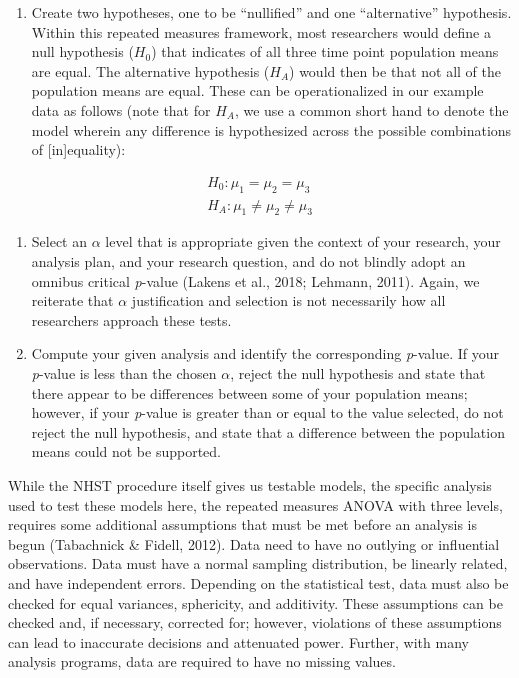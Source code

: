 \documentclass[english,mask,man]{apa6}
\providecommand{\tightlist}{%
  \setlength{\itemsep}{0pt}\setlength{\parskip}{0pt}}
\theoremstyle{definition}
\theoremstyle{definition}
\theoremstyle{definition}
\theoremstyle{remark}
\begin{document}
\begin{enumerate}
\def\labelenumi{\arabic{enumi})}
\tightlist
\item
  Create two hypotheses, one to be \enquote{nullified} and one
  \enquote{alternative} hypothesis. Within this repeated measures
  framework, most researchers would define a null hypothesis (\(H_0\))
  that indicates of all three time point population means are equal. The
  alternative hypothesis (\(H_A\)) would then be that not all of the
  population means are equal. These can be operationalized in our
  example data as follows (note that for \(H_A\), we use a common short
  hand to denote the model wherein any difference is hypothesized across
  the possible combinations of {[}in{]}equality):
\end{enumerate}

\[
\begin{aligned}
  H_0: \mu_1 = \mu_2 = \mu_3 \\
  H_A: \mu_1 \neq \mu_2 \neq \mu_3
\end{aligned}
\]

\begin{enumerate}
\def\labelenumi{\arabic{enumi})}
\setcounter{enumi}{1}
\item
  Select an \(\alpha\) level that is appropriate given the context of
  your research, your analysis plan, and your research question, and do
  not blindly adopt an omnibus critical \emph{p}-value (Lakens et al.,
  2018; Lehmann, 2011). Again, we reiterate that \(\alpha\)
  justification and selection is not necessarily how all researchers
  approach these tests.
\item
  Compute your given analysis and identify the corresponding
  \emph{p}-value. If your \emph{p}-value is less than the chosen
  \(\alpha\), reject the null hypothesis and state that there appear to
  be differences between some of your population means; however, if your
  \emph{p}-value is greater than or equal to the value selected, do not
  reject the null hypothesis, and state that a difference between the
  population means could not be supported.
\end{enumerate}

While the NHST procedure itself gives us testable models, the specific
analysis used to test these models here, the repeated measures ANOVA
with three levels, requires some additional assumptions that must be met
before an analysis is begun (Tabachnick \& Fidell, 2012). Data need to
have no outlying or influential observations. Data must have a normal
sampling distribution, be linearly related, and have independent errors.
Depending on the statistical test, data must also be checked for equal
variances, sphericity, and additivity. These assumptions can be checked
and, if necessary, corrected for; however, violations of these
assumptions can lead to inaccurate decisions and attenuated power.
Further, with many analysis programs, data are required to have no
missing values.
\end{document}
